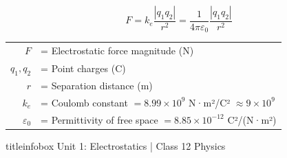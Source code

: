 \begin{frame}
\vspace{0.3cm}

\begin{formulabox}
\vspace{0.2cm}
\begin{equation*}
\boxed{F = k_e \frac{|q_1 q_2|}{r^2} = \frac{1}{4\pi\varepsilon_0} \frac{|q_1 q_2|}{r^2}}
\end{equation*}
\vspace{0.15cm}

\begin{tabular}{r l}
$F$ & = Electrostatic force magnitude (N) \\
$q_1, q_2$ & = Point charges (C) \\
$r$ & = Separation distance (m) \\
$k_e$ & = Coulomb constant $= 8.99 \times 10^9$ N·m²/C² $\approx 9 \times 10^9$ \\
$\varepsilon_0$ & = Permittivity of free space $= 8.85 \times 10^{-12}$ C²/(N·m²)
\end{tabular}
\vspace{0.15cm}
\end{formulabox}

\vfill

\begin{beamercolorbox}[wd=\textwidth,ht=0.5cm,dp=0.1cm,center]{titleinfobox}
    \small\color{coolgray} Unit 1: Electrostatics | Class 12 Physics
\end{beamercolorbox}
\end{frame}

